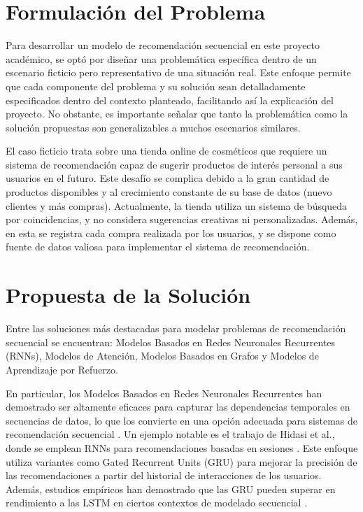 \documentclass[runningheads]{llncs}
\begin{document}
\section{Formulación del Problema}

Para desarrollar un modelo de recomendación secuencial en este proyecto académico, se optó por diseñar una problemática específica dentro de un escenario ficticio pero representativo de una situación real. Este enfoque permite que cada componente del problema y su solución sean detalladamente especificados dentro del contexto planteado, facilitando así la explicación del proyecto. No obstante, es importante señalar que tanto la problemática como la solución propuestas son generalizables a muchos escenarios similares.

El caso ficticio trata sobre una tienda online de cosméticos que requiere un sistema de recomendación capaz de sugerir productos de interés personal a sus usuarios en el futuro. Este desafío se complica debido a la gran cantidad de productos disponibles y al crecimiento constante de su base de datos (nuevo clientes y más compras). Actualmente, la tienda utiliza un sistema de búsqueda por coincidencias, y no considera sugerencias creativas ni personalizadas. Además, en esta se registra cada compra realizada por los usuarios, y se dispone como fuente de datos valiosa para implementar el sistema de recomendación.

\section{Propuesta de la Solución}

Entre las soluciones más destacadas para modelar problemas de recomendación secuencial se encuentran: Modelos Basados en Redes Neuronales Recurrentes (RNNs), Modelos de Atención, Modelos Basados en Grafos y Modelos de Aprendizaje por Refuerzo.

En particular, los Modelos Basados en Redes Neuronales Recurrentes han demostrado ser altamente eficaces para capturar las dependencias temporales en secuencias de datos, lo que los convierte en una opción adecuada para sistemas de recomendación secuencial \cite{goodfellow2016deep}. Un ejemplo notable es el trabajo de Hidasi et al., donde se emplean RNNs para recomendaciones basadas en sesiones \cite{hidasi2016session}. Este enfoque utiliza variantes como Gated Recurrent Units (GRU) para mejorar la precisión de las recomendaciones a partir del historial de interacciones de los usuarios. Además, estudios empíricos han demostrado que las GRU pueden superar en rendimiento a las LSTM en ciertos contextos de modelado secuencial \cite{chung2014empirical}.
\end{document}
